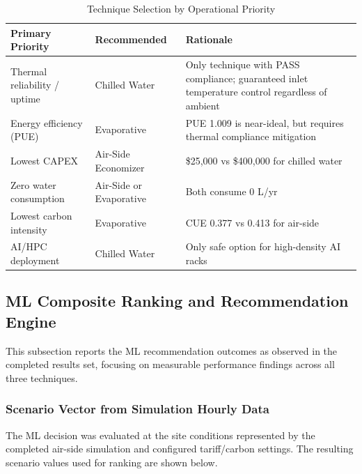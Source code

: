﻿\documentclass[12pt,a4paper]{report}
\begin{document}
\begin{table}[H]
\centering
\caption{Technique Selection by Operational Priority}
\label{tab:decision_priority}
\renewcommand{\arraystretch}{1.45}
\begin{tabular}{p{4.5cm}lp{5.5cm}}
\toprule
\textbf{Primary Priority} & \textbf{Recommended} & \textbf{Rationale} \\
\midrule
Thermal reliability / uptime & Chilled Water & Only technique with PASS compliance;
  guaranteed inlet temperature control regardless of ambient \\
Energy efficiency (PUE) & Evaporative & PUE 1.009 is near-ideal, but requires thermal
  compliance mitigation \\
Lowest CAPEX & Air-Side Economizer & \$25{,}000 vs \$400{,}000 for chilled water \\
Zero water consumption & Air-Side or Evaporative & Both consume 0 L/yr \\
Lowest carbon intensity & Evaporative & CUE 0.377 vs 0.413 for air-side \\
AI/HPC deployment & Chilled Water & Only safe option for high-density AI racks \\
\bottomrule
\end{tabular}
\end{table}

\subsection{ML Composite Ranking and Recommendation Engine}

This subsection reports the ML recommendation outcomes as observed in the completed
results set, focusing on measurable performance findings across all three techniques.

\subsubsection{Scenario Vector from Simulation Hourly Data}

The ML decision was evaluated at the site conditions represented by the completed
air-side simulation and configured tariff/carbon settings. The resulting scenario values
used for ranking are shown below.
\end{document}
